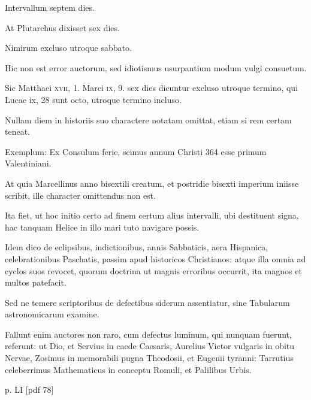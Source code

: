 \begin{parnumbers}
Intervallum septem
dies.

At Plutarchus dixisset sex dies.

Nimirum excluso utroque
sabbato.

Hic non est error auctorum, sed idiotismus usurpantium
modum vulgi consuetum.

Sic Matthaei \textsc{xvii}, 1.
 Marci \textsc{ix}, 9.
 sex
dies dicuntur excluso utroque termino, qui Lucae {ix}, 28
 sunt octo,
utroque termino incluso.

Nullam diem in historiis suo charactere
notatam omittat, etiam si rem certam teneat.

Exemplum: Ex Consulum
ferie, scimus annum Christi 364 esse primum Valentiniani.

At quia Marcellinus anno bisextili creatum, et postridie bisexti imperium
iniisse scribit, ille character omittendus non est.

Ita fiet, ut
hoc initio certo ad finem certum alius intervalli, ubi destituent signa,
hac tanquam Helice in illo mari tuto navigare possis.

Idem dico de eclipsibus, indictionibus, annis Sabbaticis, aera Hispanica,
celebrationibus Paschatis, passim apud historicos Christianos: atque
illa omnia ad cyclos suos revocet, quorum doctrina ut magnis erroribus
occurrit, ita magnos et multos patefacit.

Sed ne temere scriptoribus
de defectibus siderum assentiatur, sine Tabularum astronomicarum
examine.

Fallunt enim auctores non raro, cum defectus
luminum, qui nunquam fuerunt, referunt: ut Dio, et Servius in
caede Caesaris, Aurelius Victor vulgaris in obitu Nervae, Zosimus in
memorabili pugna Theodosii, et Eugenii tyranni: Tarrutius celeberrimus
Mathematicus in conceptu Romuli, et Palilibus Urbis.

\clearpage
p. LI [pdf 78]


\end{parnumbers}
